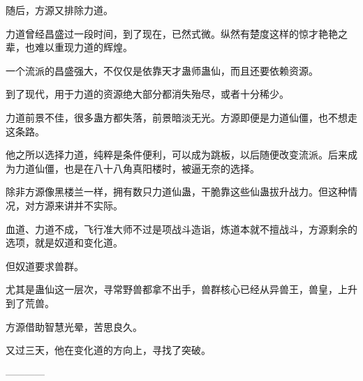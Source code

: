 \begin{this_body}
随后，方源又排除力道。

力道曾经昌盛过一段时间，到了现在，已然式微。纵然有楚度这样的惊才艳艳之辈，也难以重现力道的辉煌。

一个流派的昌盛强大，不仅仅是依靠天才蛊师蛊仙，而且还要依赖资源。

到了现代，用于力道的资源绝大部分都消失殆尽，或者十分稀少。

力道前景不佳，很多蛊方都失落，前景暗淡无光。方源即便是力道仙僵，也不想走这条路。

他之所以选择力道，纯粹是条件便利，可以成为跳板，以后随便改变流派。后来成为力道仙僵，也是在八十八角真阳楼时，被逼无奈的选择。

除非方源像黑楼兰一样，拥有数只力道仙蛊，干脆靠这些仙蛊拔升战力。但这种情况，对方源来讲并不实际。

血道、力道不成，飞行准大师不过是项战斗造诣，炼道本就不擅战斗，方源剩余的选项，就是奴道和变化道。

但奴道要求兽群。

尤其是蛊仙这一层次，寻常野兽都拿不出手，兽群核心已经从异兽王，兽皇，上升到了荒兽。

方源借助智慧光晕，苦思良久。

又过三天，他在变化道的方向上，寻找了突破。

------------

\end{this_body}

